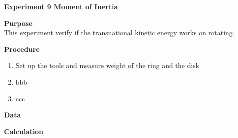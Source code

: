 \documentclass[12pt,letterpaper,fleqn]{article}
\begin{document}
\hfill
{}\hfill
\begin{center}
{\LARGE\bf Experiment 9\linebreak  
            Moment of Inertia}
\end{center}



\begin{flushleft}
{\LARGE\bf Purpose}\\
{\hspace{3pt}This experiment verify if the transnational kinetic energy works on rotating.  }
\end{flushleft}

\begin{flushleft}
{\LARGE\bf Procedure}
\begin{enumerate}
\item Set up the tools and measure weight of the ring and the disk
\item bbb
\item ccc
\end{enumerate}
\end{flushleft}



\begin{flushleft}
{\LARGE\bf Data}
\end{flushleft}




\begin{flushleft}
{\LARGE\bf Calculation}
\end{flushleft}
\end{document}
